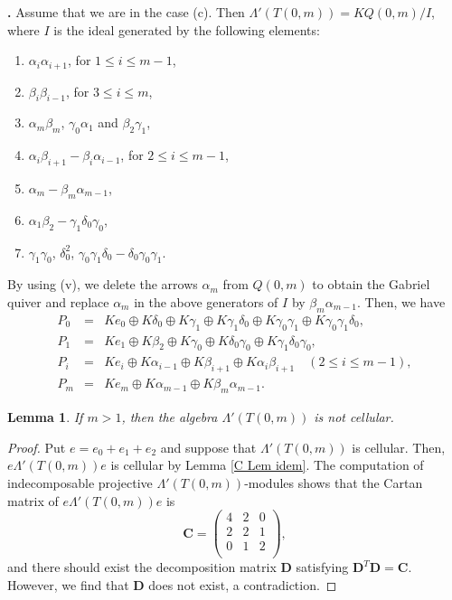 \documentclass[12pt]{amsart}
\newtheorem{lem}[thm]{Lemma}
\def \para{\refstepcounter{thm} \par\medskip\noindent
                \textbf{\thethm .} }
\numberwithin{equation}{thm}
\newcommand\bC{\mathbf C}
\newcommand\bD{\mathbf D}
\begin{document}
\para
Assume that we are in the case (c). Then $\Lambda'(T(0,m))=KQ(0,m)/I$, where 
$I$ is the ideal generated by the following elements:
\begin{enumerate}
\item $\alpha_i\alpha_{i+1}$, for $1\leq i\leq m-1$, 
\item $\beta_i\beta_{i-1}$, for  $3\leq i\leq m$, 
\item $\alpha_m\beta_m$, $\gamma_0\alpha_1$ and $\beta_2\gamma_1$,
\item $\alpha_i\beta_{i+1}-\beta_i\alpha_{i-1}$, for $2\leq i\leq m-1$, 
\item $\alpha_m-\beta_m\alpha_{m-1}$,
\item $\alpha_{1}\beta_{2}-\gamma_{1}\delta_{0}\gamma_{0}$,
\item $\gamma_{1}\gamma_{0}$, $\delta_{0}^2$, $\gamma_{0}\gamma_{1}\delta_{0}-\delta_{0}\gamma_{0}\gamma_{1}$.
\end{enumerate}
By using (v), we delete the arrows $\alpha_{m}$ from $Q(0,m)$ to obtain the Gabriel quiver  
and replace $\alpha_m$ in the above generators of $I$ by $\beta_m\alpha_{m-1}$. Then, we have 
\[\begin{array}{lcl}
P_{0} &=& Ke_0\oplus K\delta_{0}\oplus K\gamma_{1} \oplus K\gamma_1\delta_0\oplus K\gamma_{0}\gamma_{1}\oplus K\gamma_{0}\gamma_{1}\delta_{0}, \\
P_1  &=& Ke_1\oplus K\beta_2\oplus K\gamma_0\oplus K\delta_{0}\gamma_0\oplus K\gamma_1\delta_0\gamma_0, \\
P_{i} &=& Ke_{i} \oplus  K\alpha_{i-1} \oplus K\beta_{i+1}\oplus K\alpha_{i}\beta_{i+1} \quad (2\leq i \leq m-1), \\
P_m &=& Ke_m\oplus K\alpha_{m-1} \oplus K\beta_m\alpha_{m-1}.     
\end{array} \]

\begin{lem}
\label{D I-2 (c)}
If $m>1$, then the algebra $\Lambda'(T(0,m))$ is not cellular.
\end{lem}
\begin{proof}
Put $e=e_0+e_1+e_2$ and suppose that $\Lambda'(T(0,m))$ is cellular. Then, $e\Lambda'(T(0,m))e$ is cellular by Lemma \ref{C Lem idem}. 
The computation of indecomposable projective $\Lambda'(T(0,m))$-modules 
shows that the Cartan matrix of $e\Lambda'(T(0,m))e$ is 
\[ 
\bC=\begin{pmatrix}
4 & 2 & 0  \\
2 & 2 & 1  \\
0 & 1 & 2  \\
\end{pmatrix},
\]
and there should exist the decomposition matrix $\bD$ satisfying $\bD^T\bD=\bC$. 
However, we find that $\bD$ does not exist, a contradiction.
\end{proof}
\end{document}
